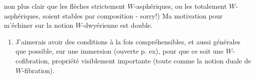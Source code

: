 \documentclass[11pt]{article}
\newcommand{\msp}[1]{\marginpar{\footnotesize [#1]}}
\begin{document}
\msp{page 114}

non plus clair que les flèches strictement $W$-asphériques, ou les totalement $W$-asphériques, soient stables par composition - sorry!) Ma motivation pour m'échiner sur la notion $W$-dwyérienne est double.

\begin{enumerate}[label=\alph*)]
\item J'aimerais avoir des conditions à la fois compréhensibles, et aussi générales que possible, sur une immersion (ouverte p. ex), pour que ce soit une $W$-cofibration, propriété visiblement importante (toute comme la notion duale de $W$-fibration). %
\end{enumerate}
\end{document}
